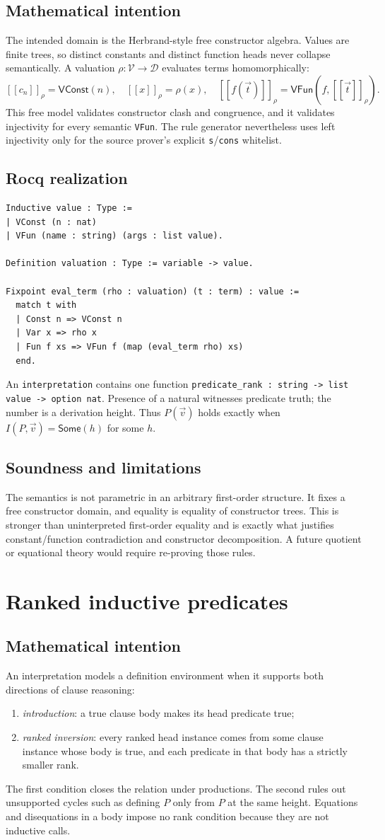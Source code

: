 \documentclass[11pt,oneside]{book}
\DeclareRobustCommand{\code}[1]{\nolinkurl{#1}}
\newcommand{\sem}[1]{[\![#1]\!]}
\newcommand{\mathintent}{\subsection*{Mathematical intention}}
\newcommand{\rocqreal}{\subsection*{Rocq realization}}
\newcommand{\soundlim}{\subsection*{Soundness and limitations}}
\begin{document}
\mathintent

The intended domain is the Herbrand-style free constructor algebra.  Values
are finite trees, so distinct constants and distinct function heads never
collapse semantically.  A valuation \(\rho:\mathcal V\to\mathcal D\) evaluates
terms homomorphically:
\[
 \sem{c_n}_\rho=\mathsf{VConst}(n),\quad
 \sem{x}_\rho=\rho(x),\quad
 \sem{f(\vec t)}_\rho
   =\mathsf{VFun}(f,\sem{\vec t}_\rho).
\]
This free model validates constructor clash and congruence, and it validates
injectivity for every semantic \code{VFun}.  The rule generator nevertheless
uses left injectivity only for the source prover's explicit \code{s}/\code{cons}
whitelist.

\rocqreal

\begin{lstlisting}[caption={The semantic carrier and term evaluation in Semantics.v.}]
Inductive value : Type :=
| VConst (n : nat)
| VFun (name : string) (args : list value).

Definition valuation : Type := variable -> value.

Fixpoint eval_term (rho : valuation) (t : term) : value :=
  match t with
  | Const n => VConst n
  | Var x => rho x
  | Fun f xs => VFun f (map (eval_term rho) xs)
  end.
\end{lstlisting}
An \code{interpretation} contains one function
\code{predicate_rank : string -> list value -> option nat}.  Presence of a
natural witnesses predicate truth; the number is a derivation height.  Thus
\(P(\vec v)\) holds exactly when \(I(P,\vec v)=\mathsf{Some}(h)\) for some
\(h\).

\soundlim

The semantics is not parametric in an arbitrary first-order structure.  It
fixes a free constructor domain, and equality is equality of constructor trees.
This is stronger than uninterpreted first-order equality and is exactly what
justifies constant/function contradiction and constructor decomposition.  A
future quotient or equational theory would require re-proving those rules.

\section{Ranked inductive predicates}

\mathintent

An interpretation models a definition environment when it supports both
directions of clause reasoning:
\begin{enumerate}[leftmargin=*]
\item \emph{introduction}: a true clause body makes its head predicate true;
\item \emph{ranked inversion}: every ranked head instance comes from some
clause instance whose body is true, and each predicate in that body has a
strictly smaller rank.
\end{enumerate}
The first condition closes the relation under productions.  The second rules
out unsupported cycles such as defining \(P\) only from \(P\) at the same
height.  Equations and disequations in a body impose no rank condition because
they are not inductive calls.
\end{document}
